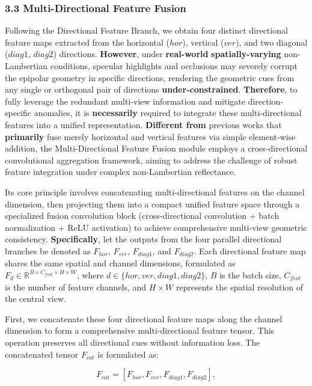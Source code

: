 \subsubsection{3.3 Multi-Directional Feature Fusion}

Following the Directional Feature Branch, we obtain four distinct directional feature maps extracted from the horizontal ($hor$), vertical ($ver$), and two diagonal ($diag1$, $diag2$) directions. \textbf{However}, under \textbf{real-world} \textbf{spatially-varying} non-Lambertian conditions, specular highlights and occlusions may severely corrupt the epipolar geometry in specific directions, rendering the geometric cues from any single or orthogonal pair of directions \textbf{under-constrained}. \textbf{Therefore}, to fully leverage the redundant multi-view information and mitigate direction-specific anomalies, it is \textbf{necessarily} required to integrate these multi-directional features into a unified representation. \textbf{Different from} previous works that \textbf{primarily} fuse merely horizontal and vertical features via simple element-wise addition, the Multi-Directional Feature Fusion module employs a cross-directional convolutional aggregation framework, aiming to address the challenge of robust feature integration under complex non-Lambertian reflectance.

Its core principle involves concatenating multi-directional features on the channel dimension, then projecting them into a compact unified feature space through a specialized fusion convolution block (cross-directional convolution + batch normalization + ReLU activation) to achieve comprehensive multi-view geometric consistency. \textbf{Specifically}, let the outputs from the four parallel directional branches be denoted as $F_{hor}$, $F_{ver}$, $F_{diag1}$, and $F_{diag2}$. Each directional feature map shares the same spatial and channel dimensions, formulated as $F_d \in \mathbb{R}^{B \times C_{feat} \times H \times W}$, where $d \in \{hor, ver, diag1, diag2\}$, $B$ is the batch size, $C_{feat}$ is the number of feature channels, and $H \times W$ represents the spatial resolution of the central view.

First, we concatenate these four directional feature maps along the channel dimension to form a comprehensive multi-directional feature tensor. This operation preserves all directional cues without information loss. The concatenated tensor $F_{cat}$ is formulated as:

\[
F_{cat} = [F_{hor}, F_{ver}, F_{diag1}, F_{diag2}], \tag{1}
\]

